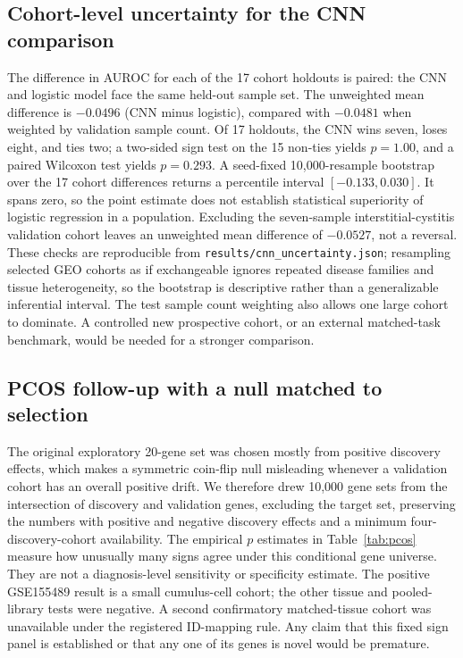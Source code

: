 \documentclass[11pt,a4paper]{article}
\begin{document}
\subsection{Cohort-level uncertainty for the CNN comparison}
The difference in AUROC for each of the 17 cohort holdouts is paired: the CNN and logistic model face the same held-out sample set. The unweighted mean difference is $-0.0496$ (CNN minus logistic), compared with $-0.0481$ when weighted by validation sample count. Of 17 holdouts, the CNN wins seven, loses eight, and ties two; a two-sided sign test on the 15 non-ties yields $p=1.00$, and a paired Wilcoxon test yields $p=0.293$. A seed-fixed 10,000-resample bootstrap over the 17 cohort differences returns a percentile interval $[-0.133,0.030]$. It spans zero, so the point estimate does not establish statistical superiority of logistic regression in a population. Excluding the seven-sample interstitial-cystitis validation cohort leaves an unweighted mean difference of $-0.0527$, not a reversal. These checks are reproducible from \texttt{results/cnn\_uncertainty.json}; resampling selected GEO cohorts as if exchangeable ignores repeated disease families and tissue heterogeneity, so the bootstrap is descriptive rather than a generalizable inferential interval. The test sample count weighting also allows one large cohort to dominate. A controlled new prospective cohort, or an external matched-task benchmark, would be needed for a stronger comparison.

\subsection{PCOS follow-up with a null matched to selection}
The original exploratory 20-gene set was chosen mostly from positive discovery effects, which makes a symmetric coin-flip null misleading whenever a validation cohort has an overall positive drift. We therefore drew 10,000 gene sets from the intersection of discovery and validation genes, excluding the target set, preserving the numbers with positive and negative discovery effects and a minimum four-discovery-cohort availability. The empirical $p$ estimates in Table~\ref{tab:pcos} measure how unusually many signs agree under this conditional gene universe. They are not a diagnosis-level sensitivity or specificity estimate. The positive GSE155489 result is a small cumulus-cell cohort; the other tissue and pooled-library tests were negative. A second confirmatory matched-tissue cohort was unavailable under the registered ID-mapping rule. Any claim that this fixed sign panel is established or that any one of its genes is novel would be premature.

\end{document}
